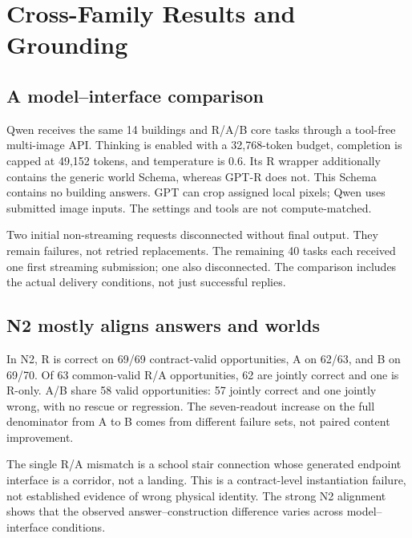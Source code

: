 \section{Cross-Family Results and Grounding}
\label{sec:crossfamily}

\begin{center}
\small

\label{tab:qwen}
\end{center}

\subsection{A model--interface comparison}
Qwen receives the same 14 buildings and R/A/B core tasks through a
tool-free multi-image API. Thinking is enabled with a 32,768-token
budget, completion is capped at 49,152 tokens, and temperature is 0.6.
Its R wrapper additionally contains the generic world Schema, whereas
GPT-R does not. This Schema contains no building answers.
GPT can crop assigned local pixels; Qwen uses submitted image inputs.
The settings and tools are not compute-matched.

Two initial non-streaming requests disconnected without final output.
They remain failures, not retried replacements.
The remaining 40 tasks each received one first streaming submission;
one also disconnected. The comparison includes the actual delivery
conditions, not just successful replies.

\subsection{N2 mostly aligns answers and worlds}
In N2, R is correct on 69/69 contract-valid opportunities, A on 62/63,
and B on 69/70. Of 63 common-valid R/A opportunities, 62 are jointly
correct and one is R-only. A/B share 58 valid opportunities:
57 jointly correct and one jointly wrong, with no rescue or regression.
The seven-readout increase on the full denominator from A to B comes
from different failure sets, not paired content improvement.

The single R/A mismatch is a school stair connection whose generated
endpoint interface is a corridor, not a landing. This is a contract-level
instantiation failure, not established evidence of wrong physical
identity. The strong N2 alignment shows that the observed
answer--construction difference varies across model--interface conditions.

